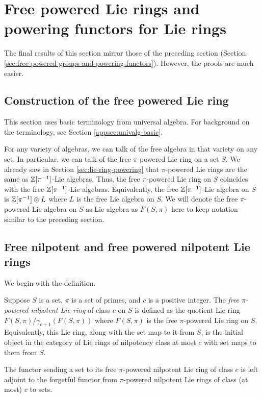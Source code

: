 
\section{Free powered Lie rings and powering functors for Lie rings}\label{sec:free-powered-lie-rings-and-powering-functors}

The final results of this section mirror those of the preceding
section (Section
\ref{sec:free-powered-groups-and-powering-functors}). However, the
proofs are much easier.
\subsection{Construction of the free powered Lie ring}

This section uses basic terminology from universal algebra. For
background on the terminology, see Section
\ref{appsec:univalg-basic}.

For any variety of algebras, we can talk of the free algebra in that
variety on any set. In particular, we can talk of the free
$\pi$-powered Lie ring on a set $S$. We already saw in Section
\ref{sec:lie-ring-powering} that $\pi$-powered Lie rings are the same
as $\mathbb{Z}[\pi^{-1}]$-Lie algebras. Thus, the free $\pi$-powered Lie ring
on $S$ coincides with the free $\mathbb{Z}[\pi^{-1}]$-Lie
algebras. Equivalently, the free $\mathbb{Z}[\pi^{-1}]$-Lie algebra on $S$ is
$\mathbb{Z}[\pi^{-1}] \otimes L$ where $L$ is the free Lie algebra on $S$. We
will denote the free $\pi$-powered Lie algebra on $S$ as Lie algebra
as $F(S,\pi)$ here to keep notation similar to the preceding section.

\subsection{Free nilpotent and free powered nilpotent Lie rings}\label{sec:free-powered-nilpotent-lie}

We begin with the definition.

\begin{definer}
  Suppose $S$ is a set, $\pi$ is a set of primes, and $c$ is a
  positive integer. The {\em free $\pi$-powered nilpotent Lie ring} of
  class $c$ on $S$ is defined as the quotient Lie ring
  $F(S,\pi)/\gamma_{c+1}(F(S,\pi))$ where $F(S,\pi)$ is the free
  $\pi$-powered Lie ring on $S$. Equivalently, this Lie ring, along
  with the set map to it from $S$, is the initial object in the
  category of Lie rings of nilpotency class at most $c$ with set maps to
  them from $S$.

  The functor sending a set to its free $\pi$-powered nilpotent Lie ring
  of class $c$ is left adjoint to the forgetful functor from
  $\pi$-powered nilpotent Lie rings of class (at most) $c$ to sets.
\end{definer}

